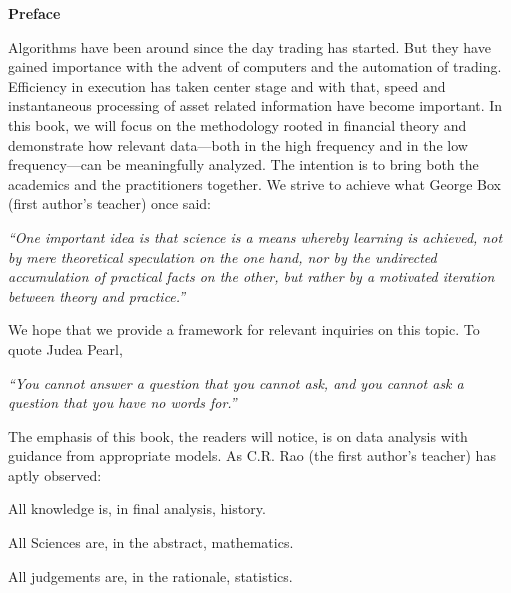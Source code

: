 \begin{center} {\large\bfseries Preface} \end{center}

Algorithms have been around since the day trading has started. But they have gained importance with the advent of computers and the automation of trading. Efficiency in execution has taken center stage and with that, speed and instantaneous processing of asset related information have become important. In this book, we will focus on the methodology rooted in financial theory and demonstrate how relevant data---both in the high frequency and in the low frequency---can be meaningfully analyzed. The intention is to bring both the academics and the practitioners together. We strive to achieve what George Box (first author's teacher) once said: \par
        \begin{center}
        \begin{minipage}[t]{0.7\textwidth}
        	\raggedright
          	{\itshape``One important idea is that science is a means whereby learning is achieved, not by mere theoretical speculation on the one hand, nor by the undirected accumulation of practical facts on the other, but rather by a motivated iteration between theory and practice.''}
        \end{minipage} 
        \end{center}

We hope that we provide a framework for relevant inquiries on this topic. To quote Judea Pearl, \par
        \begin{center}
        \begin{minipage}[t]{0.7\textwidth}
        	\raggedright
          	{\itshape``You cannot answer a question that you cannot ask, and you cannot ask a question that you have no words for.''}
        \end{minipage} 
        \end{center}
The emphasis of this book, the readers will notice, is on data analysis with guidance from appropriate models. As C.R. Rao (the first author's teacher) has aptly observed: \vspace{0.5\baselineskip}

\noindent All knowledge is, in final analysis, history. \par
\noindent All Sciences are, in the abstract, mathematics. \par
\noindent All judgements are, in the rationale, statistics. \twomedskip



